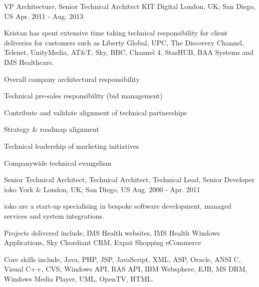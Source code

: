 \begin{cventries}
\cvexpentry
{VP Architecture, Senior Technical Architect} %
{KIT Digital} %
{London, UK; San Diego, US} %
{Apr. 2011 - Aug. 2013} %
{
\begin{cvitemstitle}
\item {Kristan has spent extensive time taking technical responsibility for client deliveries for customers such as Liberty Global, UPC, The Discovery Channel, Telenet, UnityMedia, AT\&T, Sky, BBC, Channel 4, StarHUB, BAA Systems and IMS Healthcare.}
\end{cvitemstitle}
}
{ %
\begin{cvitems}
\item{Overall company architectural responsibility}
\item{Technical pre-sales responsibility (bid management)}
\item{Contribute and validate alignment of technical partnerships}
\item{Strategy \& roadmap alignment}
\item{Technical leadership of marketing initiatives}
\item{Companywide technical evangelism }
\end{cvitems}
}


\cvexpentry
{Senior Technical Architect, Technical Architect, Technical Lead, Senior Developer} %
{ioko} %
{York \& London, UK; San Diego, US} %
{Aug. 2000 - Apr. 2011} %
{
\begin{cvitemstitle}
\item {ioko are a start-up specialising in bespoke software development, managed services and system integrations.}
\end{cvitemstitle}
}
{ %
\begin{cvitems}
\item {Projects delivered include, IMS Health websites, IMS Health Windows Applications, Sky Chordiant CRM, Expat Shopping eCommerce}
\item {Core skills include, Java, PHP, JSP, JavaScript, XML, ASP, Oracle, ANSI C, Visual C++, CVS, Windows API, RAS API, IBM Websphere, EJB, MS DRM, Windows Media Player, UML, OpenTV, HTML.}
\end{cvitems}
}


\end{cventries}
